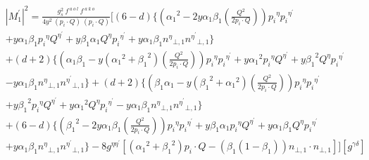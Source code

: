 \begin{equation}
\begin{split}
&{|{M}^{\prime}_1|}^2 =\frac{g_s^2 \:f^{\:a\:o\:l}\: f^{\:a\:k\:o}}{4y^2\:(p_i\cdot Q) \:(p_i\cdot Q)}[(6-d)\lbrace({\alpha_1}^2 -2y\alpha_1 \beta_1(\frac{Q^2}{2p_i \cdot Q})) {p_i}^{\eta}{p_i}^{{\eta}^{\prime}}\\
&+y\alpha_1\beta_1 {p_i}^{\eta}{Q}^{{\eta}^{\prime}}+y\beta_1\alpha_1  {Q}^{\eta}{p_i}^{{\eta}^{\prime}}+y\alpha_1\beta_1{n^{{\eta}}}_{\bot,1}{n^{{\eta}^{\prime}}}_{\bot,1}\rbrace\\
&+(d+2)\lbrace(\alpha_1\beta_1-y({\alpha_1}^2+{\beta_1}^2) (\frac{Q^2}{2p_i \cdot Q})) {p_i}^{\eta}{p_i}^{{\eta}^{\prime}}+y{\alpha_1}^2{p_i}^{\eta}{Q}^{{\eta}^{\prime}}+y{\beta_1}^2 {Q}^{\eta}{p_i}^{{\eta}^{\prime}}\\
&-y\alpha_1\beta_1{n^{{\eta}}}_{\bot,1}{n^{{\eta}^{\prime}}}_{\bot,1}\rbrace+(d+2)\lbrace(\beta_1\alpha_1-y({\beta_1}^2+{\alpha_1}^2)(\frac{Q^2}{2p_i \cdot Q})) {p_i}^{\eta}{p_i}^{{\eta}^{\prime}}\\
&+y{\beta_1}^2{p_i}^{\eta}{Q}^{{\eta}^{\prime}}+y{\alpha_1}^2 {Q}^{\eta}{p_i}^{{\eta}^{\prime}}-y\alpha_1\beta_1{n^{{\eta}}}_{\bot,1}{n^{{\eta}^{\prime}}}_{\bot,1}\rbrace\\
&+(6-d)\lbrace({\beta_1}^2 -2y\alpha_1\beta_1 (\frac{Q^2}{2p_i \cdot Q})) {p_i}^{\eta}{p_i}^{{\eta}^{\prime}}+y\beta_1\alpha_1 {p_i}^{\eta}{Q}^{{\eta}^{\prime}}+y\alpha_1\beta_1 {Q}^{\eta}{p_i}^{{\eta}^{\prime}}\\
&+y\alpha_1\beta_1{n^{{\eta}}}_{\bot,1}{n^{{\eta}^{\prime}}}_{\bot,1}\rbrace-8g^{{\eta}{{\eta}^{\prime}}}[({\alpha_1}^2+{\beta_1}^2) p_i \cdot Q - ({\beta_1}(1-\beta_1)){n}_{\bot,1}\cdot{n}_{\bot,1}]][g^{{\gamma}{{\delta}}}]
\end{split}
\end{equation}



